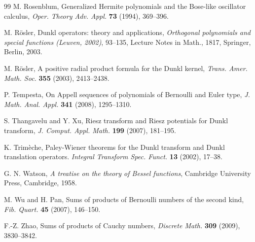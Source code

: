 \documentclass[11pt]{article}
\theoremstyle{plain}
\theoremstyle{remark}
\numberwithin{equation}{section} %
\begin{document}
\begin{thebibliography}{99}
M. Rosenblum,
{Generalized Hermite polynomials and the Bose-like oscillator calculus},
\textit{Oper. Theory Adv. Appl.}
\textbf{73} (1994), 369--396.

M. R\"osler,
Dunkl operators: theory and applications,
\textit{Orthogonal polynomials and special functions 
(Leuven, 2002)}, 93--135, 
Lecture Notes in Math., 1817, Springer, Berlin, 2003.

M. R\"osler,
A positive radial product formula for the Dunkl kernel,
\textit{Trans. Amer. Math. Soc.}
\textbf{355} (2003), 2413--2438.

P. Tempesta,
On Appell sequences of polynomials of Bernoulli and Euler type,
\textit{J. Math. Anal. Appl.} 
\textbf{341} (2008), 1295--1310.

S. Thangavelu and Y. Xu,
Riesz transform and Riesz potentials for Dunkl transform,
\textit{J. Comput. Appl. Math.}
\textbf{199} (2007), 181--195.

K. Trim\`eche,
Paley-Wiener theorems for the Dunkl transform and Dunkl translation operators.
\textit{Integral Transform Spec. Funct.} 
\textbf{13} (2002), 17--38.

G. N. Watson,
\textit{A treatise on the theory of Bessel functions},
Cambridge University Press, Cambridge, 1958.

M. Wu and H. Pan, 
Sums of products of Bernoulli numbers of the second kind, 
\textit{Fib. Quart.} \textbf{45} (2007), 146--150.

F.-Z. Zhao, %
Sums of products of Cauchy numbers,
\textit{Discrete Math.}
\textbf{309} (2009), 3830--3842.

\end{thebibliography}

\end{document}
